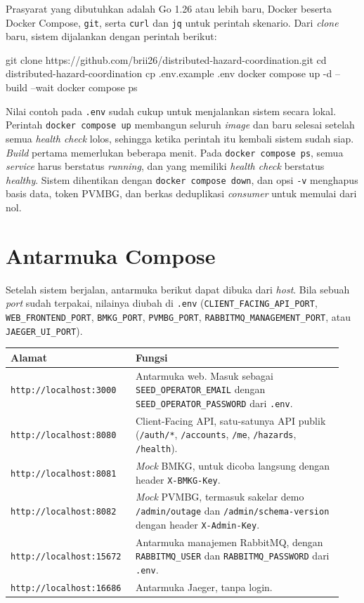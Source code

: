 Prasyarat yang dibutuhkan adalah Go 1.26 atau lebih baru, Docker beserta Docker Compose, \texttt{git}, serta \texttt{curl} dan \texttt{jq} untuk perintah skenario. Dari \textit{clone} baru, sistem dijalankan dengan perintah berikut:

\begin{codebox}
git clone https://github.com/brii26/distributed-hazard-coordination.git
cd distributed-hazard-coordination
cp .env.example .env
docker compose up -d --build --wait
docker compose ps
\end{codebox}

Nilai contoh pada \texttt{.env} sudah cukup untuk menjalankan sistem secara lokal. Perintah \texttt{docker compose up} membangun seluruh \textit{image} dan baru selesai setelah semua \textit{health check} lolos, sehingga ketika perintah itu kembali sistem sudah siap. \textit{Build} pertama memerlukan beberapa menit. Pada \texttt{docker compose ps}, semua \textit{service} harus berstatus \textit{running}, dan yang memiliki \textit{health check} berstatus \textit{healthy}. Sistem dihentikan dengan \texttt{docker compose down}, dan opsi \texttt{-v} menghapus basis data, token PVMBG, dan berkas deduplikasi \textit{consumer} untuk memulai dari nol.

\section{Antarmuka Compose}

Setelah sistem berjalan, antarmuka berikut dapat dibuka dari \textit{host}. Bila sebuah \textit{port} sudah terpakai, nilainya diubah di \texttt{.env} (\texttt{CLIENT\_FACING\_API\_PORT}, \texttt{WEB\_FRONTEND\_PORT}, \texttt{BMKG\_PORT}, \texttt{PVMBG\_PORT}, \texttt{RABBITMQ\_MANAGEMENT\_PORT}, atau \texttt{JAEGER\_UI\_PORT}).

\begin{longtable}[]{|>{\raggedright\arraybackslash}p{0.34\linewidth}|>{\raggedright\arraybackslash}p{0.6\linewidth}|}
\hline
\textbf{Alamat} & \textbf{Fungsi} \\
\hline
\endhead
\texttt{http://localhost:3000} & Antarmuka web. Masuk sebagai \texttt{SEED\_OPERATOR\_EMAIL} dengan \texttt{SEED\_OPERATOR\_PASSWORD} dari \texttt{.env}. \\
\hline
\texttt{http://localhost:8080} & Client-Facing API, satu-satunya API publik (\texttt{/auth/*}, \texttt{/accounts}, \texttt{/me}, \texttt{/hazards}, \texttt{/health}). \\
\hline
\texttt{http://localhost:8081} & \textit{Mock} BMKG, untuk dicoba langsung dengan header \texttt{X-BMKG-Key}. \\
\hline
\texttt{http://localhost:8082} & \textit{Mock} PVMBG, termasuk sakelar demo \texttt{/admin/outage} dan \texttt{/admin/schema-version} dengan header \texttt{X-Admin-Key}. \\
\hline
\texttt{http://localhost:15672} & Antarmuka manajemen RabbitMQ, dengan \texttt{RABBITMQ\_USER} dan \texttt{RABBITMQ\_PASSWORD} dari \texttt{.env}. \\
\hline
\texttt{http://localhost:16686} & Antarmuka Jaeger, tanpa login. \\
\hline
\end{longtable}

